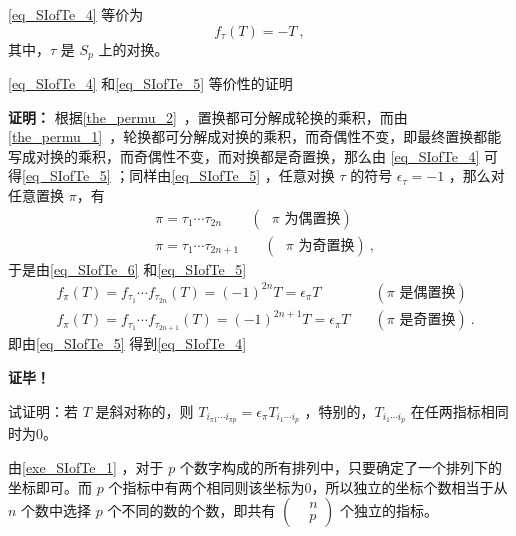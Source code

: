 \autoref{eq_SIofTe_4} 等价为
\begin{equation}\label{eq_SIofTe_5}
f_\tau(T)=-T~,
\end{equation}
其中，$\tau$ 是 $S_p$ 上的对换。
\begin{example}{}
\autoref{eq_SIofTe_4} 和\autoref{eq_SIofTe_5} 等价性的证明

\textbf{证明：}
根据\autoref{the_permu_2}~，置换都可分解成轮换的乘积，而由\autoref{the_permu_1}~，轮换都可分解成对换的乘积，而奇偶性不变，即最终置换都能写成对换的乘积，而奇偶性不变，而对换都是奇置换，那么由 \autoref{eq_SIofTe_4} 可得\autoref{eq_SIofTe_5} ；同样由\autoref{eq_SIofTe_5} ，任意对换 $\tau$ 的符号 $\epsilon_\tau=-1$ ，那么对任意置换 $\pi$，有
\begin{equation}
\begin{aligned}
&\pi=\tau_1\cdots\tau_{2n} \quad &(\text{ $\pi$ 为偶置换})\\
&\pi=\tau_1\cdots\tau_{2n+1} &\quad (\text{ $\pi$ 为奇置换})~,
\end{aligned}
\end{equation}
于是由\autoref{eq_SIofTe_6} 和\autoref{eq_SIofTe_5} 
\begin{equation}
\begin{aligned}
&f_\pi(T)=f_{\tau_1}\cdots f_{\tau_{2n}}(T)=(-1)^{2n}T=\epsilon_\pi T\quad&(\text{$\pi$ 是偶置换})\\
&f_\pi(T)=f_{\tau_1}\cdots f_{\tau_{2n+1}}(T)=(-1)^{2n+1}T=\epsilon_\pi T\quad&(\text{$\pi$ 是奇置换})~.
\end{aligned}
\end{equation}
即由\autoref{eq_SIofTe_5} 得到\autoref{eq_SIofTe_4} 

\textbf{证毕！}

\end{example}






\begin{exercise}{}\label{exe_SIofTe_1}
试证明：若 $T$ 是斜对称的，则 $T_{i_{\pi1}\cdots i_{\pi p}}=\epsilon_\pi T_{i_1\cdots i_p}$ ，特别的，$ T_{i_1\cdots i_p}$ 在任两指标相同时为0。
\end{exercise}

由\autoref{exe_SIofTe_1} ，对于 $p$ 个数字构成的所有排列中，只要确定了一个排列下的坐标即可。而 $p$ 个指标中有两个相同则该坐标为0，所以独立的坐标个数相当于从 $n$ 个数中选择 $p$ 个不同的数的个数，即共有 $\left(\begin{aligned}
&n\\
&p
\end{aligned}\right)$
个独立的指标。

